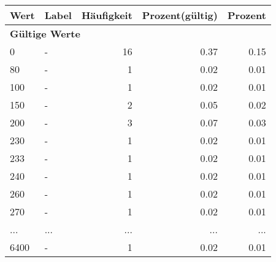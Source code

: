      \begin{longtable}{lXrrr}
     \toprule
     \textbf{Wert} & \textbf{Label} & \textbf{Häufigkeit} & \textbf{Prozent(gültig)} & \textbf{Prozent} \\
     \endhead
     \midrule
     \multicolumn{5}{l}{\textbf{Gültige Werte}}\\
        0 & \multicolumn{1}{X}{-} & %
          \num{16} &
          \num[round-mode=places,round-precision=2]{0,37} &
          \num[round-mode=places,round-precision=2]{0,15} \\
        80 & \multicolumn{1}{X}{-} & %
          \num{1} &
          \num[round-mode=places,round-precision=2]{0,02} &
          \num[round-mode=places,round-precision=2]{0,01} \\
        100 & \multicolumn{1}{X}{-} & %
          \num{1} &
          \num[round-mode=places,round-precision=2]{0,02} &
          \num[round-mode=places,round-precision=2]{0,01} \\
        150 & \multicolumn{1}{X}{-} & %
          \num{2} &
          \num[round-mode=places,round-precision=2]{0,05} &
          \num[round-mode=places,round-precision=2]{0,02} \\
        200 & \multicolumn{1}{X}{-} & %
          \num{3} &
          \num[round-mode=places,round-precision=2]{0,07} &
          \num[round-mode=places,round-precision=2]{0,03} \\
        230 & \multicolumn{1}{X}{-} & %
          \num{1} &
          \num[round-mode=places,round-precision=2]{0,02} &
          \num[round-mode=places,round-precision=2]{0,01} \\
        233 & \multicolumn{1}{X}{-} & %
          \num{1} &
          \num[round-mode=places,round-precision=2]{0,02} &
          \num[round-mode=places,round-precision=2]{0,01} \\
        240 & \multicolumn{1}{X}{-} & %
          \num{1} &
          \num[round-mode=places,round-precision=2]{0,02} &
          \num[round-mode=places,round-precision=2]{0,01} \\
        260 & \multicolumn{1}{X}{-} & %
          \num{1} &
          \num[round-mode=places,round-precision=2]{0,02} &
          \num[round-mode=places,round-precision=2]{0,01} \\
        270 & \multicolumn{1}{X}{-} & %
          \num{1} &
          \num[round-mode=places,round-precision=2]{0,02} &
          \num[round-mode=places,round-precision=2]{0,01} \\
       ... & ... & ... & ... & ... \\
        6400 & \multicolumn{1}{X}{-} & %
          \num{1} &
          \num[round-mode=places,round-precision=2]{0,02} &
          \num[round-mode=places,round-precision=2]{0,01} \\


\end{longtable}
